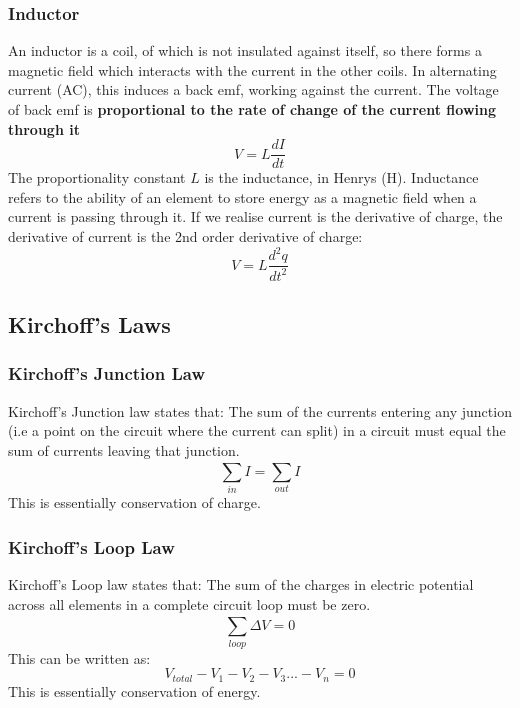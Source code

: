 \documentclass[10pt]{report}
\begin{document}
{\subsubsection{Inductor}
\par{An inductor is a coil, of which is not insulated against itself, so there forms a magnetic field which interacts with the current in the other coils. In alternating current (AC), this induces a back emf, working against the current. The voltage of back emf is \textbf{proportional to the rate of change of the current flowing through it} \[
V=L\frac{dI}{dt}
\] The proportionality constant $L$ is the inductance, in Henrys (H). Inductance refers to the ability of an element to store energy as a magnetic field when a current is passing through it. If we realise current is the derivative of charge, the derivative of current is the 2nd order derivative of charge: \[
V=L\frac{d^{2}q}{dt^{2}}
\] }
\subsection{Kirchoff's Laws}
\subsubsection{Kirchoff's Junction Law}
\par{Kirchoff's Junction law states that: The sum of the currents entering any junction (i.e a point on the circuit where the current can split) in a circuit must equal the sum of currents leaving that junction. \[
\sum_{in}^{}{I}=\sum_{out}^{}{I}
\] This is essentially conservation of charge.}
\subsubsection{Kirchoff's Loop Law}
\par{Kirchoff's Loop law states that: The sum of the charges in electric potential across all elements in a complete circuit loop must be zero. \[
\sum_{loop}^{}{\Delta V}=0
\] This can be written as: \[
V_{total}-V_{1}-V_{2}-V_{3}...-V_{n}=0
\] This is essentially conservation of energy.}
}
\end{document}
